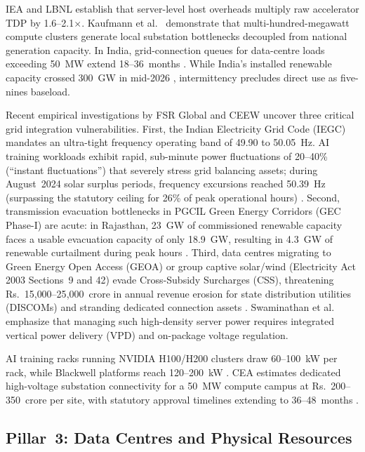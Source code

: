 \documentclass[conference]{IEEEtran}
\begin{document}
IEA \cite{iea2024aienergy} and LBNL \cite{lbnl2024datacenter} establish that server-level host overheads multiply raw accelerator TDP by 1.6--2.1$\times$. Kaufmann et al.\ \cite{kaufmann2025powergrid} demonstrate that multi-hundred-megawatt compute clusters generate local substation bottlenecks decoupled from national generation capacity. In India, grid-connection queues for data-centre loads exceeding 50~MW extend 18--36~months \cite{cea2026transmission}. While India's installed renewable capacity crossed 300~GW in mid-2026 \cite{mnre2026annual}, intermittency precludes direct use as five-nines baseload.

Recent empirical investigations by FSR Global \cite{fsr2026powergrid} and CEEW \cite{ceew2026datacentre} uncover three critical grid integration vulnerabilities. First, the Indian Electricity Grid Code (IEGC) mandates an ultra-tight frequency operating band of 49.90 to 50.05~Hz. AI training workloads exhibit rapid, sub-minute power fluctuations of 20--40\% (``instant fluctuations'') that severely stress grid balancing assets; during August~2024 solar surplus periods, frequency excursions reached 50.39~Hz (surpassing the statutory ceiling for 26\% of peak operational hours) \cite{fsr2026powergrid}. Second, transmission evacuation bottlenecks in PGCIL Green Energy Corridors (GEC Phase-I) are acute: in Rajasthan, 23~GW of commissioned renewable capacity faces a usable evacuation capacity of only 18.9~GW, resulting in 4.3~GW of renewable curtailment during peak hours \cite{fsr2026powergrid}. Third, data centres migrating to Green Energy Open Access (GEOA) or group captive solar/wind (Electricity Act 2003 Sections~9 and 42) evade Cross-Subsidy Surcharges (CSS), threatening Rs.~15{,}000--25{,}000~crore in annual revenue erosion for state distribution utilities (DISCOMs) and stranding dedicated connection assets \cite{fsr2026powergrid}. Swaminathan et al.\ \cite{swaminathan2026vertical} emphasize that managing such high-density server power requires integrated vertical power delivery (VPD) and on-package voltage regulation.

AI training racks running NVIDIA H100/H200 clusters draw 60--100~kW per rack, while Blackwell platforms reach 120--200~kW \cite{nvidia2024h100}. CEA estimates dedicated high-voltage substation connectivity for a 50~MW compute campus at Rs.~200--350~crore per site, with statutory approval timelines extending to 36--48~months \cite{cea2026transmission}.

\subsection{Pillar~3: Data Centres and Physical Resources}
\end{document}
